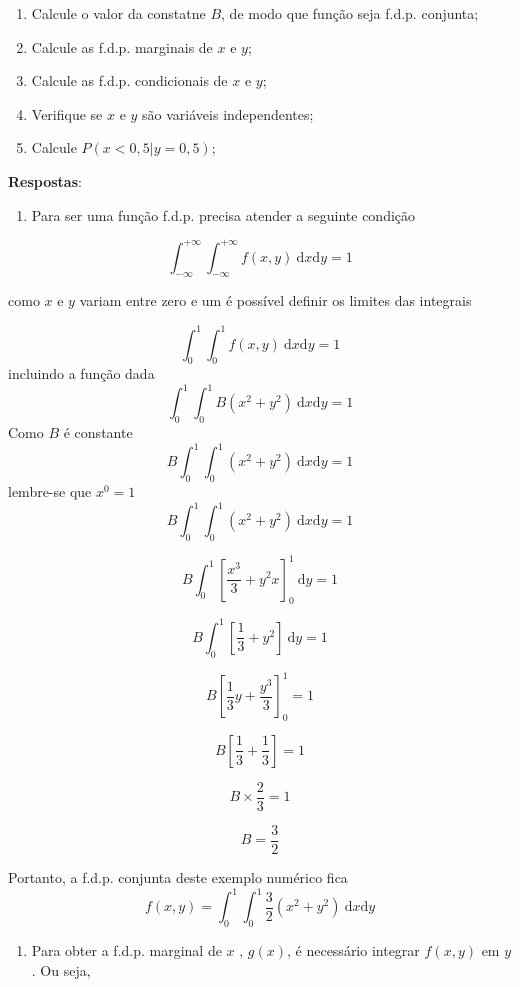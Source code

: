 \documentclass[
]{book}
\providecommand{\tightlist}{%
  \setlength{\itemsep}{0pt}\setlength{\parskip}{0pt}}
\begin{document}
\begin{enumerate}
\def\labelenumi{\alph{enumi})}
\tightlist
\item
  Calcule o valor da constatne \(B\), de modo que função seja f.d.p. conjunta;
\item
  Calcule as f.d.p. marginais de \(x\) e \(y\);
\item
  Calcule as f.d.p. condicionais de \(x\) e \(y\);
\item
  Verifique se \(x\) e \(y\) são variáveis independentes;
\item
  Calcule \(P(x <0,5|y=0,5)\);
\end{enumerate}

\textbf{Respostas}:

\begin{enumerate}
\def\labelenumi{\alph{enumi})}
\tightlist
\item
  Para ser uma função f.d.p. precisa atender a seguinte condição
\end{enumerate}

\[
  \int_{-\infty}^{+\infty}\int_{-\infty}^{+\infty}f(x,y)~\text{d}x\text{d}y = 1
\]

como \(x\) e \(y\) variam entre zero e um é possível definir os limites das integrais

\[
  \int_{0}^{1}\int_{0}^{1}f(x,y)~\text{d}x\text{d}y = 1
\]
incluindo a função dada
\[
  \int_{0}^{1}\int_{0}^{1}B(x^2 + y^2)~\text{d}x\text{d}y = 1
\]
Como \(B\) é constante
\[
  B\int_{0}^{1}\int_{0}^{1}(x^2 + y^2)~\text{d}x\text{d}y = 1
\]
lembre-se que \(x^0 = 1\)
\[
  B\int_{0}^{1}\int_{0}^{1}(x^2 + y^2)~\text{d}x\text{d}y = 1
\]

\[
  B\int_{0}^{1} \left[ \dfrac{x^3}{3} + y^2x \right]_{0}^{1}~\text{d}y = 1
\]

\[
  B\int_{0}^{1} \left[ \dfrac{1}{3} + y^2 \right]~\text{d}y = 1
\]

\[
  B\left[ \dfrac{1}{3}y + \dfrac{y^3}{3} \right]_{0}^{1} = 1
\]

\[
  B\left[ \dfrac{1}{3} + \dfrac{1}{3} \right] = 1
\]

\[
  B\times \dfrac{2}{3} = 1
\]

\[
  B = \dfrac{3}{2}
\]

Portanto, a f.d.p. conjunta deste exemplo numérico fica
\[
  f(x,y) = \int_{0}^{1}\int_{0}^{1}\dfrac{3}{2}(x^2 + y^2)~\text{d}x\text{d}y
\]

\begin{enumerate}
\def\labelenumi{\alph{enumi})}
\setcounter{enumi}{1}
\tightlist
\item
  Para obter a f.d.p. marginal de \(x\) , \(g(x)\), é necessário integrar \(f(x,y)\) em \(y\). Ou seja,
\end{enumerate}
\end{document}
